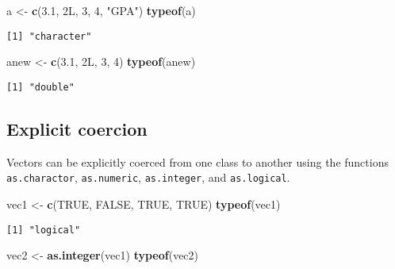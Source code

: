 \documentclass[
]{book}
\newenvironment{Shaded}{\begin{snugshade}}{\end{snugshade}}
\newcommand{\DecValTok}[1]{\textcolor[rgb]{0.00,0.00,0.81}{#1}}
\newcommand{\FloatTok}[1]{\textcolor[rgb]{0.00,0.00,0.81}{#1}}
\newcommand{\KeywordTok}[1]{\textcolor[rgb]{0.13,0.29,0.53}{\textbf{#1}}}
\newcommand{\NormalTok}[1]{#1}
\newcommand{\OtherTok}[1]{\textcolor[rgb]{0.56,0.35,0.01}{#1}}
\newcommand{\StringTok}[1]{\textcolor[rgb]{0.31,0.60,0.02}{#1}}
\begin{document}
\begin{Shaded}
\begin{Highlighting}[]
\NormalTok{a <-}\StringTok{ }\KeywordTok{c}\NormalTok{(}\FloatTok{3.1}\NormalTok{, 2L, }\DecValTok{3}\NormalTok{, }\DecValTok{4}\NormalTok{, }\StringTok{"GPA"}\NormalTok{) }
\KeywordTok{typeof}\NormalTok{(a) }
\end{Highlighting}
\end{Shaded}

\begin{verbatim}
[1] "character"
\end{verbatim}

\begin{Shaded}
\begin{Highlighting}[]
\NormalTok{anew <-}\StringTok{ }\KeywordTok{c}\NormalTok{(}\FloatTok{3.1}\NormalTok{, 2L, }\DecValTok{3}\NormalTok{, }\DecValTok{4}\NormalTok{)}
\KeywordTok{typeof}\NormalTok{(anew) }
\end{Highlighting}
\end{Shaded}

\begin{verbatim}
[1] "double"
\end{verbatim}

\hypertarget{explicit-coercion}{%
\subsection{Explicit coercion}\label{explicit-coercion}}

Vectors can be explicitly coerced from one class to another using the functions \texttt{as.charactor}, \texttt{as.numeric}, \texttt{as.integer}, and \texttt{as.logical}.

\begin{Shaded}
\begin{Highlighting}[]
\NormalTok{vec1 <-}\StringTok{ }\KeywordTok{c}\NormalTok{(}\OtherTok{TRUE}\NormalTok{, }\OtherTok{FALSE}\NormalTok{, }\OtherTok{TRUE}\NormalTok{, }\OtherTok{TRUE}\NormalTok{)}
\KeywordTok{typeof}\NormalTok{(vec1)}
\end{Highlighting}
\end{Shaded}

\begin{verbatim}
[1] "logical"
\end{verbatim}

\begin{Shaded}
\begin{Highlighting}[]
\NormalTok{vec2 <-}\StringTok{ }\KeywordTok{as.integer}\NormalTok{(vec1)}
\KeywordTok{typeof}\NormalTok{(vec2)}
\end{Highlighting}
\end{Shaded}
\end{document}
